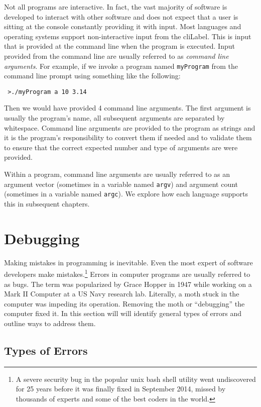 Not all programs are interactive.  In fact, the vast majority of software is developed
to interact with other software and does not expect that a user is sitting at the console
constantly providing it with input.  Most languages and operating systems support 
non-interactive input from the \gls{cliLabel}.  This is input that is provided at the command
line when the program is executed.  Input provided from the command line are usually referred
to as \emph{command line arguments}.  For example, if we invoke a program named 
\texttt{myProgram} from the command line prompt using something like the following:

\texttt{~>./myProgram a 10 3.14}

Then we would have provided 4 command line arguments.  The first argument is usually
the program's name, all subsequent arguments are separated by whitespace.  Command
line arguments are provided to the program as strings and it is the program's responsibility
to convert them if needed and to validate them to ensure that the correct expected number
and type of arguments are were provided.

Within a program, command line arguments are usually referred to as an argument vector
(sometimes in a variable named \texttt{argv}) and argument count (sometimes
in a variable named \texttt{argc}).  We explore how each language supports this
in subsequent chapters.

\section{Debugging}

Making mistakes in programming is inevitable.  Even the most expert of software 
developers make mistakes.\footnote{A severe security bug in the popular unix 
bash shell utility went undiscovered for 25 years before it was finally 
fixed in September 2014, missed by thousands of experts and some of the
best coders in the world.}  Errors in computer programs are usually 
referred to as \glspl{bug}.  The term was popularized by Grace Hopper in 
1947 while working on a Mark II Computer at a US Navy research lab.  
Literally, a moth stuck in the computer was impeding its operation.  Removing
the moth or ``debugging'' the computer fixed it.  In this section will will identify general
types of errors and outline ways to address them.

\subsection{Types of Errors}

